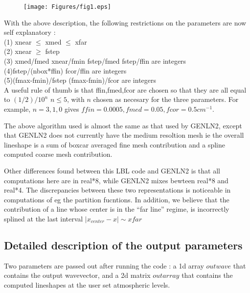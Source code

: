 \documentclass[11pt]{article}
\begin{document}
\begin{figure}[h]
  \begin{center}\texttt{[image: Figures/fig1.eps]}\end{center}
  \caption[Cartoon of Parameter Relations]{}
  \label{fig:cartoon_param}
\end{figure}

With the above description, the following restrictions on the parameters are
now self explanatory : \\
(1) xnear $\le$ xmed $\le$ xfar        \\
(2) xnear $\ge$ fstep              \\
(3) xmed/fmed  xnear/fmin   fstep/fmed   fstep/ffin       are integers \\
(4)fstep/(nbox*ffin)        fcor/ffin                     are integers \\
(5)(fmax-fmin)/fstep        (fmax-fmin)/fcor              are integers \\

A useful rule of thumb is that ffin,fmed,fcor are chosen so that they 
are all equal to $(1/2)/10^{n}$   $n \le 5$, with $n$ chosen as necesary for 
the three parameters. For example, $n=3,1,0$ gives $ffin=0.0005,fmed=0.05,
fcor=0.5 cm^{-1}$.

The above algorithm used is almost the same as that used by GENLN2, except 
that GENLN2 does not currently have the medium resoltion mesh ie the overall 
lineshape is a sum of boxcar averaged fine mesh contribution and a spline
computed coarse mesh contribution.

Other differences found between this LBL code and GENLN2 is that all 
computations here are in real*8, while GENLN2 mixes bewteen real*8 and 
real*4. 
The discrepancies between these two representations is noticeable in 
computations of eg the partition fucntions. In addition, we believe that the
contribution of a line whose center is in the ``far line'' regime, is 
incorrectly splined at the last interval $|x_{center} - x| \sim xfar$

\subsection{Detailed description of the output parameters}
Two parameters are passed out after running the code : a 1d array $outwave$ 
that contains the output wavevector, and a 2d matrix $outarray$ that 
contains the computed lineshapes at the user set atmospheric levels.
\end{document}
